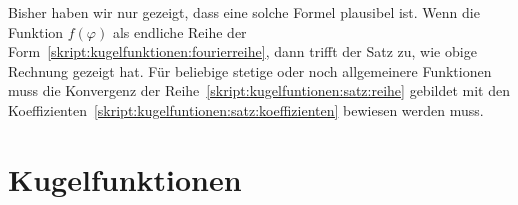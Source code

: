 Bisher haben wir nur gezeigt, dass eine solche Formel plausibel ist.
Wenn die Funktion $f(\varphi)$ als endliche Reihe der
Form~\eqref{skript:kugelfunktionen:fourierreihe}, dann trifft der
Satz zu, wie obige Rechnung gezeigt hat.
Für beliebige stetige oder noch allgemeinere Funktionen muss
die Konvergenz der Reihe~\eqref{skript:kugelfuntionen:satz:reihe}
gebildet mit den
Koeffizienten~\eqref{skript:kugelfuntionen:satz:koeffizienten}
bewiesen werden muss.

\section{Kugelfunktionen}

